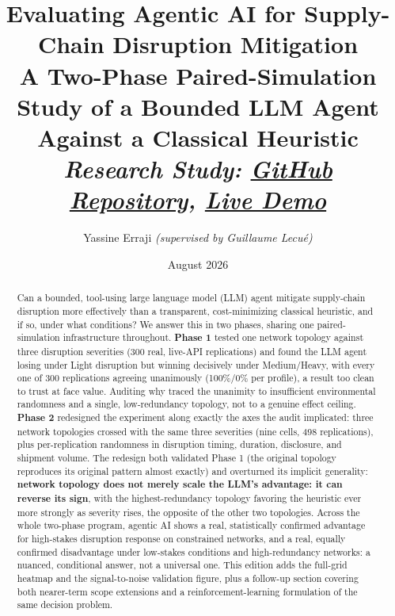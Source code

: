 \documentclass[10pt,twocolumn]{article}
\title{\vspace{-1.2em}\textbf{Evaluating Agentic AI for Supply-Chain Disruption Mitigation}\\
\large A Two-Phase Paired-Simulation Study of a Bounded LLM Agent Against a Classical Heuristic\\
\normalsize\itshape Research Study: \href{https://github.com/yassineerraji/ResearchStudy}{GitHub Repository}, \href{https://research-study-three.vercel.app}{Live Demo}}
\author{\small Yassine Erraji \textit{(supervised by Guillaume Lecu\'e)}}
\date{\small August 2026}
\begin{document}
\maketitle
\vspace{-1.6em}

\begin{abstract}
\noindent Can a bounded, tool-using large language model (LLM) agent mitigate supply-chain disruption more effectively than a transparent, cost-minimizing classical heuristic, and if so, under what conditions? We answer this in two phases, sharing one paired-simulation infrastructure throughout. \textbf{Phase 1} tested one network topology against three disruption severities (300 real, live-API replications) and found the LLM agent losing under Light disruption but winning decisively under Medium/Heavy, with every one of 300 replications agreeing unanimously (100\%/0\% per profile), a result too clean to trust at face value. Auditing why traced the unanimity to insufficient environmental randomness and a single, low-redundancy topology, not to a genuine effect ceiling. \textbf{Phase 2} redesigned the experiment along exactly the axes the audit implicated: three network topologies crossed with the same three severities (nine cells, 498 replications), plus per-replication randomness in disruption timing, duration, disclosure, and shipment volume. The redesign both validated Phase 1 (the original topology reproduces its original pattern almost exactly) and overturned its implicit generality: \textbf{network topology does not merely scale the LLM's advantage: it can reverse its sign}, with the highest-redundancy topology favoring the heuristic ever more strongly as severity rises, the opposite of the other two topologies. Across the whole two-phase program, agentic AI shows a real, statistically confirmed advantage for high-stakes disruption response on constrained networks, and a real, equally confirmed disadvantage under low-stakes conditions and high-redundancy networks: a nuanced, conditional answer, not a universal one. This edition adds the full-grid heatmap and the signal-to-noise validation figure, plus a follow-up section covering both nearer-term scope extensions and a reinforcement-learning formulation of the same decision problem.
\end{abstract}
\end{document}
